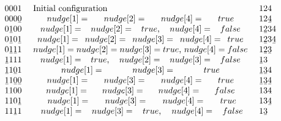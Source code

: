 $$\vbox{\halign{#&\quad#\hfil\quad&#\cr
0001 &Initial configuration &124\cr
000\b0 &$\\{nudge}[1]=\\{nudge}[2]=\\{nudge}[4]=\\{true}$
&12\b4\cr
0\b100 &$\\{nudge}[1]=\\{nudge}[2]=\\{true}$, $\\{nudge}
[4]=\\{false}$ &1\b234\cr
0\b10\b1&$\\{nudge}[1]=\\{nudge}[2]=\\{nudge}
[3]=\\{nudge}[4]=\\{true}$ &1\b23\b4\cr
0\b1\b11&$\\{nudge}[1]=\\{nudge}[2]=\\{nudge}
[3]=\\{true}$, $\\{nudge}[4]=\\{false}$ 
&1\b2\b3\cr
\b1111&$\\{nudge}[1]=\\{true}$, $\\{nudge}
[2]=\\{nudge}[3]=\\{false}$ &\b13\cr
\b11\b01&$\\{nudge}[1]=\\{nudge}[3]=\\{true}$ &\b1\b34\cr
\b11\b0\b0&$\\{nudge}[1]=\\{nudge}[3]=\\{nudge}
[4]=\\{true}$ &\b1\b3\b4\cr
1100&$\\{nudge}[1]=\\{nudge}[3]=\\{nudge}[4]=\\{false}$
&134\cr
110\b1&$\\{nudge}[1]=\\{nudge}[3]=\\{nudge}[4]=\\{true}$&13\b4\cr
11\b11&$\\{nudge}[1]=\\{nudge}[3]=\\{true}$,
$\\{nudge}[4]=\\{false}$&1\b3\cr
}}$$
